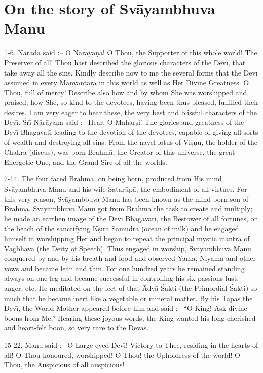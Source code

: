 \chapter{On the story of Sv\=ayambhuva Manu}

1-6. N\=arada said :-- O N\=ar\=aya\d{n}a! O Thou, the Supporter of this whole world! The Preserver of all! Thou hast described the glorious characters of the Dev\={\i}, that take away all the sins. Kindly describe now to me the several forms that the Dev\={\i} assumed in every Manvantara in this world as well as Her Divine Greatness. O Thou, full of mercy! Describe also how and by whom She was worshipped and praised; how She, so kind to the devotees, having been thus pleased, fulfilled their desires. I am very eager to hear these, the very best and blissful characters of the Dev\={\i}. \'Sr\={\i} N\=ar\=aya\d{n}a said :-- Hear, O Mahar\d{s}i! The glories and greatness of the Dev\={\i} Bhagavat\={\i} leading to the devotion of the devotees, capable of giving all sorts of wealth and destroying all sins. From the navel lotus of Vi\d{s}\d{n}u, the holder of the Chakra (discus), was born Brahm\=a, the Creator of this universe, the great Energetic One, and the Grand Sire of all the worlds.

7-14. The four faced Brahm\=a, on being born, produced from His mind Sv\=ayambhuva Manu and his wife \'Satar\=up\=a, the embodiment of all virtues. For this very reason, Sv\=ayambbuva Manu has been known as the mind-born son of Brahm\=a. Sv\=ayambhuva Manu got from Brahm\=a the task to create and multiply; he made an earthen image of the Dev\={\i} Bhagavat\={\i}, the Bestower of all fortunes, on the beach of the sanctifying K\d{s}\={\i}ra Samudra (ocean of milk) and he engaged himself in worshipping Her and began to repeat the principal mystic mantra of V\=agbhava (the Deity of Speech). Thus engaged in worship, Sv\=ayambhuva Manu conquered by and by his breath and food and observed Yama, Niyama and other vows and became lean and thin. For one hundred years he remained standing always on one leg and became successful in controlling his six passions lust, anger, etc. He meditated on the feet of that \=Ady\=a \'Sakti (the Primordial \'Sakti) so much that he became inert like a vegetable or mineral matter. By his Tapas the Dev\={\i}, the World Mother appeared before him and said :-- ``O King! Ask divine boons from Me.'' Hearing these joyous words, the King wanted his long cherished and heart-felt boon, so very rare to the Devas.

15-22. Manu said :-- O Large eyed Dev\={\i}! Victory to Thee, residing in the hearts of all! O Thou honoured, worshipped! O Thou! the Upholdress of the world! O Thou, the Auspicious of all auspicious!

